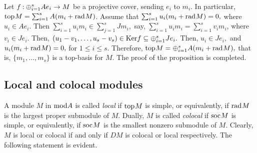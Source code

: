 \documentclass[10pt]{amsart}
\theoremstyle{definition}
\newcommand{\mmod}{{\rm mod}}
\newcommand{\rad}{{\rm rad}\hspace{.5pt}}
\newcommand{\soc}{{\rm soc}\hspace{.5pt}}
\newcommand{\ntop}{{\rm top}\hspace{.5pt}}
\newcommand{\nim}{{\rm Im}}
\newcommand{\Ker}{{\rm Ker}}
\newcommand{\vp}{\vspace{.5pt}}
\begin{document}
Let $f\hspace{-.5pt}: \hspace{-.5pt} \oplus_{i=1}^s Ae_i \to M$ be a projective cover, sending $e_i$ to $m_i$. In particular, $\ntop M=\sum_{i=1}^s A(m_i+\rad M)$. Assume that \vp $\sum_{i=1}^s u_i(m_i+\rad M)=0,$ where $u_i\in Ae_i.$ Then $\sum_{i=1}^s u_im_i\in \sum_{j=1}^s J m_i,$ say, $\sum_{i=1}^s u_i m_i=\sum_{i=1}^s v_im_i$, where $v_i\in Je_i.$ Then, $(u_1-v_1, \ldots, u_s-v_s)\in \Ker f \subseteq \oplus_{i=1}^s Je_i.$ Then, $u_i\in Je_i,$ and 
$u_i(m_i+\rad M)=0,$ for $1\le i\le s$. Therefore, $\ntop M= \oplus_{i=1}^s A(m_i+\rad M),$ 
that is, $\{m_1,\dots,m_s\}$ is a top-basis for $M$. 
The proof of the proposition is completed.



\subsection{\sc Local and colocal modules} A module $M$ in $\mmod A$ is called {\it local} if $\ntop M$ is simple, or equivalently, if $\rad M$ is the largest proper submodule of $M.$ Dually, $M$ is called {\it colocal} if $\soc M$ is simple, or equivalently, if $\soc M$ is the smallest nonzero submodule of $M.$ 
Clearly, $M$ is local or colocal if and only if $DM$ is colocal or local respectively. 
The following statement is evident. 
\vspace{-1pt}
\end{document}
